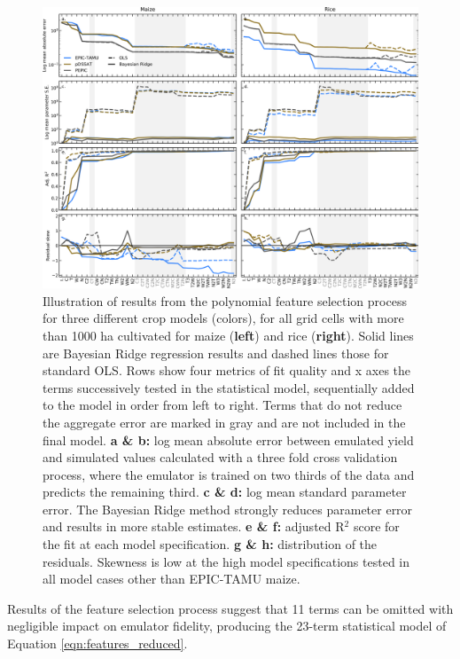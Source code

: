 \documentclass[gmd, manuscript]{copernicus} %
\begin{document}
\begin{figure}[ht]
\centering
   \includegraphics[width=15cm]{figures/model_select_maize_rice.png}
    \caption{
    Illustration of results from the polynomial feature selection process for three different crop models (colors), for all grid cells with more than 1000 ha cultivated for maize (\textbf{left}) and rice (\textbf{right}). 
    Solid lines are Bayesian Ridge regression results and dashed lines those for standard OLS. Rows show four metrics of fit quality and x axes the terms successively tested in the statistical model, sequentially added to the model in order from left to right.
    Terms that do not reduce the aggregate error are marked in {\color{dark-gray} gray} and are not included in the final model. 
    \textbf{a \& b:} log mean absolute error between emulated yield and simulated values calculated with a three fold cross validation process, where the emulator is trained on two thirds of the data and predicts the remaining third.
    \textbf{c \& d:} log mean standard parameter error. The Bayesian Ridge method strongly reduces parameter error and results in more stable estimates. 
    \textbf{e \& f:} adjusted R$^2$ score for the fit at each model specification. 
    \textbf{g \& h:} distribution of the residuals. Skewness is low at the high model specifications tested in all model cases other than EPIC-TAMU maize.
    }
   \label{fig:features}
\end{figure}

Results of the feature selection process suggest that 11 terms can be omitted with negligible impact on emulator fidelity, producing the 23-term statistical model of Equation \ref{eqn:features_reduced}.
\end{document}
